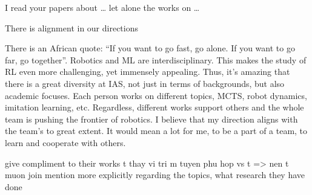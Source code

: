 I read your papers about … let alone the works on …

There is alignment in our directions

There is an African quote: “If you want to go fast, go alone. If you want to go far, go together”. Robotics and ML are interdisciplinary. This makes the study of RL even more challenging, yet immensely appealing. Thus, it’s amazing that there is a great diversity at IAS, not just in terms of backgrounds, but also academic focuses. Each person works on different topics, MCTS, robot dynamics, imitation learning, etc. Regardless, different works support others and the whole team is pushing the frontier of robotics. I believe that my direction aligns with the team’s to great extent. It would mean a lot for me, to be a part of a team, to learn and cooperate with others.

give compliment to their works
t thay vi tri m tuyen phu hop vs t => nen t muon join
mention more explicitly regarding the topics, what research they have done
